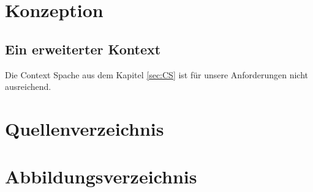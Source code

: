 \documentclass[a4paper]{article}
\begin{document}
	\section{Konzeption}	
	
	\subsection{Ein erweiterter Kontext}
	
	Die Context Spache aus dem Kapitel \ref{sec:CS} ist für unsere Anforderungen
	nicht ausreichend.
	
	\newpage
	
	\section{Quellenverzeichnis}	
	\printbibliography[type=online,heading=subbibliography,title={Webseiten}]
	\printbibliography[type=manual,heading=subbibliography,title={Handbücher}]
	\newpage
	
	\section{Abbildungsverzeichnis}
	\makeatletter
	\makeatother
\end{document}

